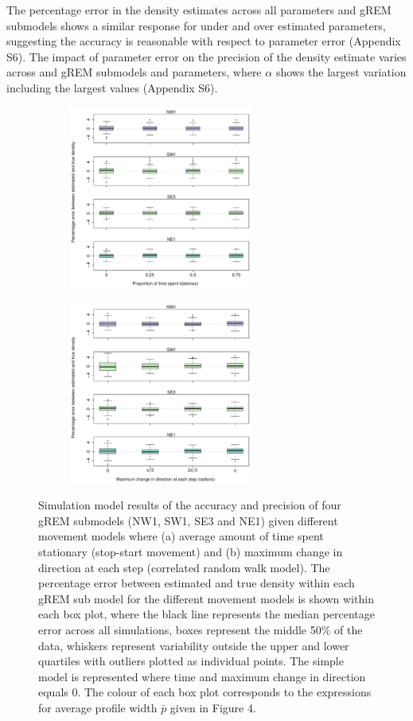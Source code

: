 \documentclass[a4paper,10pt,reqno,oneside]{amsart}
\begin{document}
The percentage error in the density estimates across all parameters and gREM submodels shows a similar response for under and over estimated parameters, suggesting the accuracy is reasonable with respect to parameter error (Appendix S6). The impact of parameter error on the precision of the density estimate varies across and gREM submodels and parameters, where $\alpha$ shows the largest variation including the largest values (Appendix S6).



\begin{figure}[t]
	\centering
	\begin{subfigure}[t]{60mm}
      		\centering
		\includegraphics[width=60mm]{imgs/ResultsPerch.pdf}
		\caption{} 
         	 \label{f:Perch}
	\end{subfigure}
	
	\begin{subfigure}[t]{60mm}
                \centering
		\includegraphics[width=60mm]{imgs/ResultsTort.pdf}
                \caption{} 
                \label{f:Tort}
         \end{subfigure}
	\label{f:BreakAssump}
	\caption{
	Simulation model results of the accuracy and precision of four gREM submodels (NW1, SW1, SE3 and NE1) given different movement models where (a) average amount of time spent stationary (stop-start movement) and (b) maximum change in direction at each step (correlated random walk model). The percentage error between estimated and true density within each gREM sub model for the different movement models is shown within each box plot, where the black line represents the median percentage error across all simulations, boxes represent the middle 50\% of the data, whiskers represent variability outside the upper and lower quartiles with outliers plotted as individual points. The simple model is represented where time and maximum change in direction equals 0. The colour of each box plot corresponds to the expressions for average profile width $\bar{p}$ given in Figure 4.} 
\end{figure}
\end{document}

